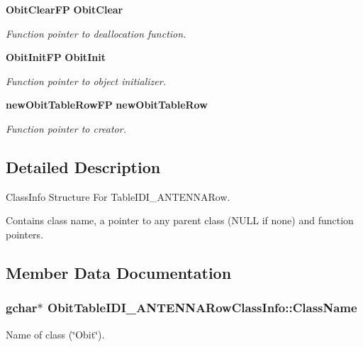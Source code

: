 \begin{CompactItemize}
{\bf Obit\-Clear\-FP} {\bf Obit\-Clear}
\begin{CompactList}\small\item\em Function pointer to deallocation function. \item\end{CompactList}\item 
{\bf Obit\-Init\-FP} {\bf Obit\-Init}
\begin{CompactList}\small\item\em Function pointer to object initializer. \item\end{CompactList}\item 
{\bf new\-Obit\-Table\-Row\-FP} {\bf new\-Obit\-Table\-Row}
\begin{CompactList}\small\item\em Function pointer to creator. \item\end{CompactList}\end{CompactItemize}


\subsection{Detailed Description}
Class\-Info Structure For Table\-IDI\_\-ANTENNARow. 

Contains class name, a pointer to any parent class (NULL if none) and function pointers. 



\subsection{Member Data Documentation}
\subsubsection{\setlength{\rightskip}{0pt plus 5cm}gchar$\ast$ {\bf Obit\-Table\-IDI\_\-ANTENNARow\-Class\-Info::Class\-Name}}\label{structObitTableIDI__ANTENNARowClassInfo_o2}


Name of class (\char`\"{}Obit\char`\"{}). 

